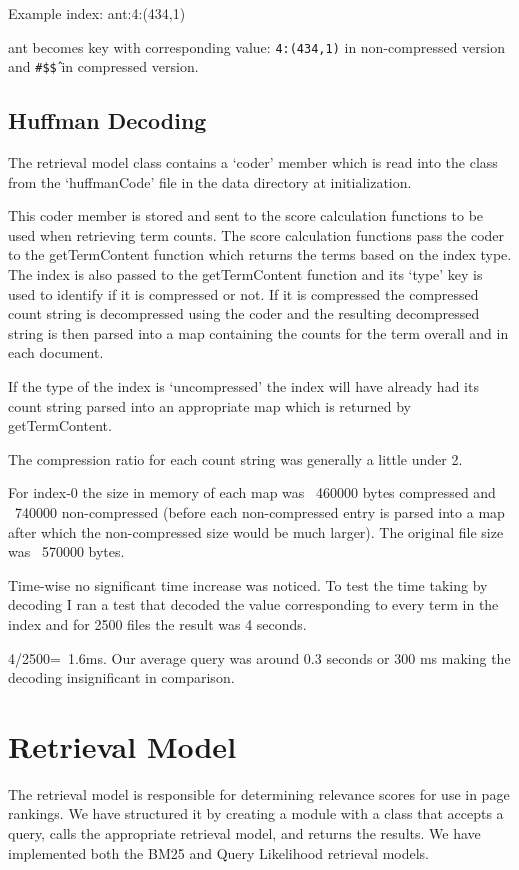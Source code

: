 \documentclass[letterpaper,11pt,twoside]{article}
\begin{document}
Example index:
ant:4:(434,1)

ant becomes key with corresponding value: \texttt{4:(434,1)} in non-compressed version and \texttt{\#\$\^\$} in compressed version.

\subsection{Huffman Decoding}
The retrieval model class contains a `coder' member which is read into the class from the `huffmanCode' file in the data directory at initialization.

This coder member is stored and sent to the score calculation functions to be used when retrieving term counts. The score calculation functions pass the coder to the getTermContent function which returns the terms based on the index type. The index is also passed to the getTermContent function and its `type' key is used to identify if it is compressed or not. If it is compressed the compressed count string is decompressed using the coder and the resulting decompressed string is then parsed into a map containing the counts for the term overall and in each document.

If the type of the index is `uncompressed' the index will have already had its count string parsed into an appropriate map which is returned by getTermContent.

The compression ratio for each count string was generally a little under 2.

For index-0 the size in memory of each map was ~460000 bytes compressed and ~740000 non-compressed (before each non-compressed entry is parsed into a map after which the non-compressed size would be much larger). The original file size was ~570000 bytes.

Time-wise no significant time increase was noticed. To test the time taking by decoding I ran a test that decoded the value corresponding to every term in the index and for 2500 files the result was 4 seconds.

4/2500=~1.6ms. Our average query was around 0.3 seconds or 300 ms making the decoding insignificant in comparison.

\section{Retrieval Model}

The retrieval model is responsible for determining relevance scores for use in page rankings. We have structured it by creating a module with a class that accepts a query, calls the appropriate retrieval model, and returns the results. We have implemented both the BM25 and Query Likelihood retrieval models.
\end{document}
